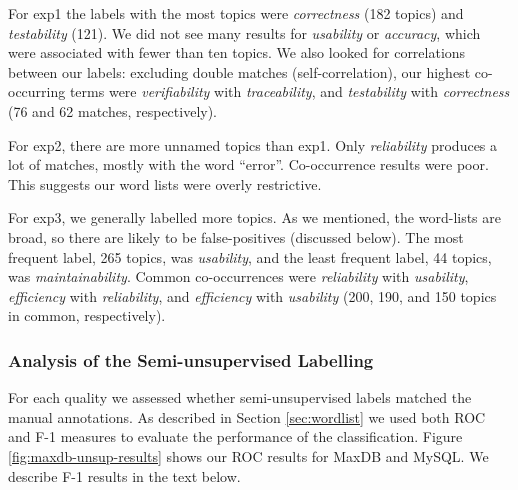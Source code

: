 \documentclass[smallextended]{svjour3}       %
\begin{document}
For \textsf{exp1} the labels with the most topics
were
\emph{correctness} (182 topics) and \emph{testability} (121). 
We did not see many results for \emph{usability} or \emph{accuracy}, which were associated with fewer than ten topics. 
We also looked for correlations between our labels: excluding double matches (self-correlation), our highest co-occurring terms were \emph{verifiability} with \emph{traceability}, and \emph{testability} with \emph{correctness} (76 and 62 matches, respectively).

\balance
\newpage

For \textsf{exp2}, there are more unnamed topics than \textsf{exp1}. 
Only \emph{reliability} produces a lot of matches, mostly with the word ``error''. 
Co-occurrence results were poor. This suggests our word lists were overly restrictive.

For \textsf{exp3}, we generally labelled more topics. 
As we mentioned, the word-lists are broad, so there are likely to be false-positives (discussed below). 
The most frequent label, 265 topics, was \emph{usability}, and the
least frequent label, 44 topics, was \emph{maintainability}. 
Common co-occurrences were \emph{reliability} with \emph{usability}, \emph{efficiency} with \emph{reliability}, and \emph{efficiency} with \emph{usability} (200, 190, and 150 topics in common, respectively). 



\subsubsection{Analysis of the Semi-unsupervised Labelling} %
For each quality we assessed whether semi-unsupervised labels matched the manual annotations. %
As described in Section \ref{sec:wordlist} we used both ROC and F-1 measures to evaluate the performance of the classification.
Figure \ref{fig:maxdb-unsup-results} shows our ROC results for MaxDB and MySQL. We describe F-1 results in the text below.
\end{document}
